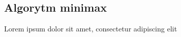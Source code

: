 \subsection{Algorytm minimax}
\label{subsec:algorytm-minimax}

Lorem ipsum dolor sit amet, consectetur adipiscing elit